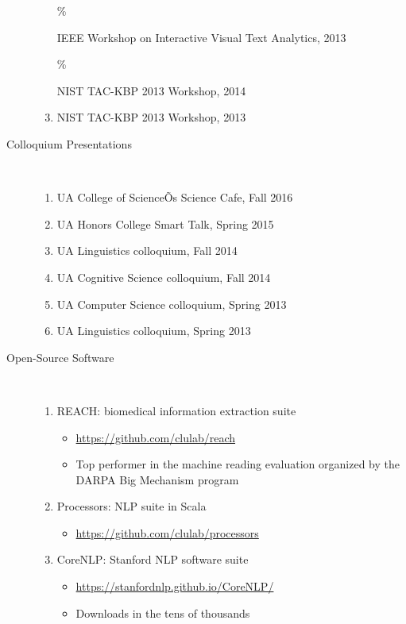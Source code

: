 \documentclass[10pt]{article}
\begin{document}
\begin{description}
\begin{enumerate}
\item 
[\% \addtocounter{enumi}{1}\theenumi ]
IEEE Workshop on Interactive Visual Text Analytics, 2013

\item 
[\% \addtocounter{enumi}{1}\theenumi ]
NIST TAC-KBP 2013 Workshop, 2014

\item 
NIST TAC-KBP 2013 Workshop, 2013


\end{enumerate}


\item [Colloquium Presentations]\

\begin{enumerate}
\item UA College of ScienceÕs Science Cafe, Fall 2016
\item UA Honors College Smart Talk, Spring 2015
\item UA Linguistics colloquium, Fall 2014
\item UA Cognitive Science colloquium, Fall 2014
\item UA Computer Science colloquium, Spring 2013
\item UA Linguistics colloquium, Spring 2013
\end{enumerate}

\item [Open-Source Software]\

\begin{enumerate}

\item REACH: biomedical information extraction suite
\begin{itemize}
\item \url{https://github.com/clulab/reach}
\item Top performer in the machine reading evaluation organized by the DARPA Big Mechanism program
\end{itemize}

\item Processors: NLP suite in Scala
\begin{itemize}
\item \url{https://github.com/clulab/processors }
\end{itemize}

\item CoreNLP: Stanford NLP software suite
\begin{itemize}
\item \url{https://stanfordnlp.github.io/CoreNLP/}
\item Downloads in the tens of thousands
\end{itemize}


\end{enumerate}
\end{description}
\end{document}
